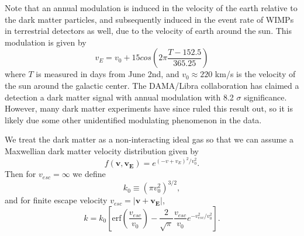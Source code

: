\documentclass[a4paper,12pt]{article}
\begin{document}
Note that an annual modulation is induced in the velocity of the earth relative to the dark matter particles, and subsequently induced in the event rate of WIMPs in terrestrial detectors as well, due to the velocity of earth around the sun.  This modulation is given by 
\begin{equation}
v_E = v_0 + 15cos(2\pi \frac{T - 152.5}{365.25})
\end{equation}
where $T$ is measured in days from June 2nd, and $v_0 \approx 220$ km/s is the velocity of the sun around the galactic center. The DAMA/Libra collaboration has claimed a detection a dark matter signal with annual modulation with 8.2 $\sigma$ significance.  However, many dark matter experiments have since ruled this result out, so it is likely due some other unidentified modulating phenomenon in the data.

We treat the dark matter as a non-interacting ideal gas so that we can assume a Maxwellian dark matter velocity distribution given by
\begin{equation}
f(\mathbf{v},\mathbf{v_E})=e^{(-v+v_{E})^2/v_0^2}.
\end{equation}
Then for $v_{esc}=\infty$ we define
\begin{equation} \label{k-not}
k_0 \equiv (\pi v_0^2)^{3/2},
\end{equation}
and for finite escape velocity $v_{esc}=|\mathbf{v}+\mathbf{v_E}|$,
\begin{equation}
k=k_0[\mbox{erf}(\frac{v_{esc}}{v_0}) - \frac{2}{\sqrt{\pi}} \frac{v_{esc}}{v_0} e^{-v_{esc}^2/v_0^2}].
\end{equation}
\end{document}
